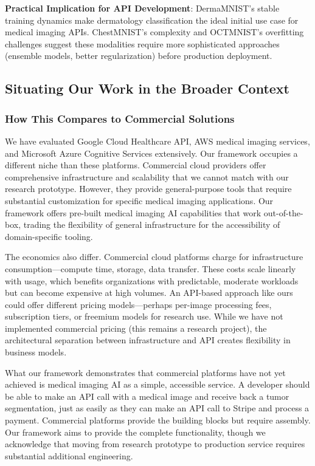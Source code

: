 \documentclass[12pt,a4paper]{article}
\begin{document}
\textbf{Practical Implication for API Development}: DermaMNIST's stable training dynamics make dermatology classification the ideal initial use case for medical imaging APIs. ChestMNIST's complexity and OCTMNIST's overfitting challenges suggest these modalities require more sophisticated approaches (ensemble models, better regularization) before production deployment.

\subsection{Situating Our Work in the Broader Context}

\subsubsection{How This Compares to Commercial Solutions}

We have evaluated Google Cloud Healthcare API, AWS medical imaging services, and Microsoft Azure Cognitive Services extensively. Our framework occupies a different niche than these platforms. Commercial cloud providers offer comprehensive infrastructure and scalability that we cannot match with our research prototype. However, they provide general-purpose tools that require substantial customization for specific medical imaging applications. Our framework offers pre-built medical imaging AI capabilities that work out-of-the-box, trading the flexibility of general infrastructure for the accessibility of domain-specific tooling.

The economics also differ. Commercial cloud platforms charge for infrastructure consumption—compute time, storage, data transfer. These costs scale linearly with usage, which benefits organizations with predictable, moderate workloads but can become expensive at high volumes. An API-based approach like ours could offer different pricing models—perhaps per-image processing fees, subscription tiers, or freemium models for research use. While we have not implemented commercial pricing (this remains a research project), the architectural separation between infrastructure and API creates flexibility in business models.

What our framework demonstrates that commercial platforms have not yet achieved is medical imaging AI as a simple, accessible service. A developer should be able to make an API call with a medical image and receive back a tumor segmentation, just as easily as they can make an API call to Stripe and process a payment. Commercial platforms provide the building blocks but require assembly. Our framework aims to provide the complete functionality, though we acknowledge that moving from research prototype to production service requires substantial additional engineering.
\end{document}
